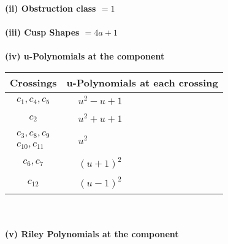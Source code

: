 \documentclass[1p]{elsarticle_modified}
\theoremstyle{definition}
\begin{document}
\flushleft \textbf{(ii) Obstruction class $= 1$}\\~\\
\flushleft \textbf{(iii) Cusp Shapes $= 4 a+1$}\\~\\
\newpage\renewcommand{\arraystretch}{1}
\flushleft \textbf{(iv) u-Polynomials at the component}\newline \\
\begin{tabular}{m{50pt}|m{274pt}}
Crossings & \hspace{64pt}u-Polynomials at each crossing \\
\hline $$\begin{aligned}c_{1},c_{4},c_{5}\end{aligned}$$&$\begin{aligned}
&u^2- u+1
\end{aligned}$\\
\hline $$\begin{aligned}c_{2}\end{aligned}$$&$\begin{aligned}
&u^2+u+1
\end{aligned}$\\
\hline $$\begin{aligned}c_{3},c_{8},c_{9}\\c_{10},c_{11}\end{aligned}$$&$\begin{aligned}
&u^2
\end{aligned}$\\
\hline $$\begin{aligned}c_{6},c_{7}\end{aligned}$$&$\begin{aligned}
&(u+1)^2
\end{aligned}$\\
\hline $$\begin{aligned}c_{12}\end{aligned}$$&$\begin{aligned}
&(u-1)^2
\end{aligned}$\\
\hline
\end{tabular}\\~\\
\newpage\renewcommand{\arraystretch}{1}
\flushleft \textbf{(v) Riley Polynomials at the component}\newline \\
\end{document}
